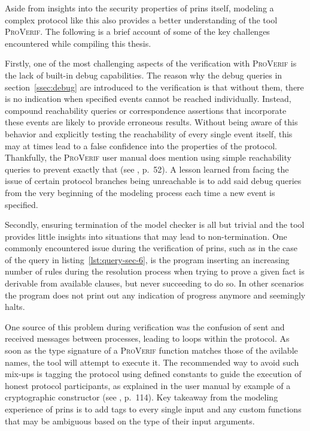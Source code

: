 Aside from insights into the security properties of \gls{prins} itself, modeling a complex protocol like this also provides a better understanding of the tool \textsc{ProVerif}.
The following is a brief account of some of the key challenges encountered while compiling this thesis.\medskip

Firstly, one of the most challenging aspects of the verification with \textsc{ProVerif} is the lack of built-in debug capabilities.
The reason why the debug queries in section~\ref{ssec:debug} are introduced to the verification is that without them, there is no indication when specified events cannot be reached individually.
Instead, compound reachability queries or correspondence assertions that incorporate these events are likely to provide erroneous results.
Without being aware of this behavior and explicitly testing the reachability of every single event itself, this may at times lead to a false confidence into the properties of the protocol.
Thankfully, the \textsc{ProVerif} user manual does mention using simple reachability queries to prevent exactly that (see \cite{blanchet2020proverif}, p.~52).
A lesson learned from facing the issue of certain protocol branches being unreachable is to add said debug queries from the very beginning of the modeling process each time a new event is specified.\medskip

Secondly, ensuring termination of the model checker is all but trivial and the tool provides little insights into situations that may lead to non-termination.
One commonly encountered issue during the verification of \gls{prins}, such as in the case of the query in listing~\ref{lst:query-sec-6}, is the program inserting an increasing number of rules during the resolution process when trying to prove a given fact is derivable from available clauses, but never succeeding to do so.
In other scenarios the program does not print out any indication of progress anymore and seemingly halts.

One source of this problem during verification was the confusion of sent and received messages between processes, leading to loops within the protocol.
As soon as the type signature of a \textsc{ProVerif} function matches those of the avilable names, the tool will attempt to execute it.
The recommended way to avoid such mix-ups is tagging the protocol using defined constants to guide the execution of honest protocol participants, as explained in the user manual by example of a cryptographic constructor (see \cite{blanchet2020proverif}, p.~114).
Key takeaway from the modeling experience of \gls{prins} is to add tags to every single input and any custom functions that may be ambiguous based on the type of their input arguments.

